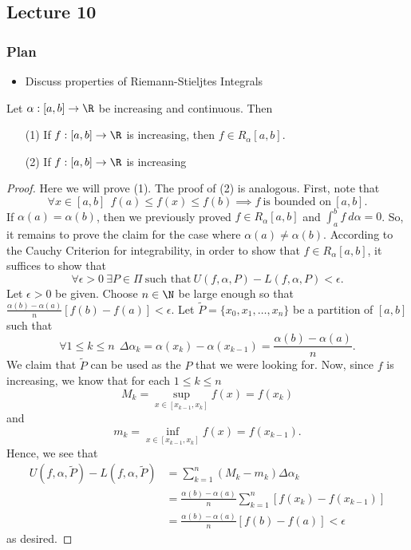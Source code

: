 \subsection{Lecture 10}

\subsubsection{Plan}

\begin{itemize}
    \item Discuss properties of Riemann-Stieljtes Integrals
\end{itemize}


\begin{theorem}[Rudin 6.9]\label{Rudin 6.9}
    Let \( \alpha: [a,b] \to \R  \) be increasing and continuous. Then 
    \begin{enumerate}
        \item[(1)] If \( f:[a,b] \to \R  \) is increasing, then \( f \in {R}_{\alpha}[a,b] \).
        \item[(2)] If \( f: [a,b] \to \R  \) is increasing
    \end{enumerate}
\end{theorem}
\begin{proof}
Here we will prove (1). The proof of (2) is analogous. First, note that
\[  \forall x \in [a,b] \ \ f(a) \leq f(x) \leq f(b)  \implies f \ \text{is bounded on} \ [a,b].\]
If \( \alpha(a) = \alpha(b) \), then we previously proved \( f \in {R}_{\alpha}[a,b] \) and \( \int_{ a }^{ b }  f  \ d \alpha = 0  \). So, it remains to prove the claim for the case where \( \alpha(a) \neq \alpha(b) \). According to the Cauchy Criterion for integrability, in order to show that \( f \in {R}_{\alpha}[a,b]  \), it suffices to show that
\[  \forall \epsilon > 0 \ \exists P \in \Pi \ \text{such that} \ U(f,\alpha, P) - L(f,\alpha, P) < \epsilon.  \]
Let \( \epsilon > 0  \) be given. Choose \( n \in \N \) be large enough so that \( \frac{ \alpha(b) - \alpha(a)  }{ n  }  [f(b) - f(a)] < \epsilon \). Let \( \tilde{P} = \{  x_{0}, {x}_{1}, \dots, {x}_{n} \}  \) be a partition of \( [a,b] \) such that 
\[  \forall 1 \leq k \leq n \ \ \Delta {\alpha}_{k} = \alpha({x}_{k}) - \alpha({x}_{k-1}) = \frac{ \alpha(b) - \alpha(a) }{  n  }. \]
We claim that \( \tilde{P} \) can be used as the \( P  \) that we were looking for. Now, since \( f  \) is increasing, we know that for each \( 1 \leq  k \leq n  \)
\[  {M}_{k} = \sup_{x \in [{x}_{k-1}, {x}_{k}]} f(x) = f({x}_{k}) \]
and
\[  {m}_{k } = \inf_{x \in [{x}_{k-1}, {x}_{k}]} f(x) = f({x}_{k-1}). \]
Hence, we see that 
\begin{align*}
    U(f,\alpha, \tilde{P}) - L(f,\alpha, \tilde{P})  &= \sum_{ k=1  }^{ n } ({M}_{k } - {m}_{k}) \Delta {\alpha}_{k }  \\
                                                     &= \frac{ \alpha(b) - \alpha(a) }{ n }  \sum_{ k=1  }^{ n } [f({x}_{k}) - f({x}_{k-1})] \\
                                                     &= \frac{ \alpha(b) - \alpha(a) }{  n }  [f(b) - f(a)] < \epsilon
\end{align*}
as desired.
\end{proof}

